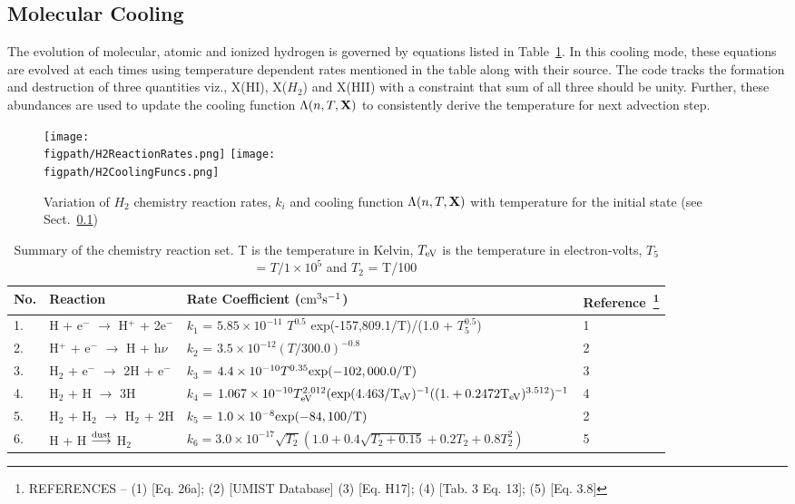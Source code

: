 \documentclass[useAMS,usenatbib,letters]{mn2e}
\newcommand{\figpath}{PFIGS/}
\begin{document}
\subsection{Molecular Cooling}
\label{ssec:molcool}
The evolution of molecular, atomic and ionized hydrogen is governed by
equations listed in Table~\ref{tab:chemeq}. In this cooling mode,
these equations are evolved at each times using temperature dependent
rates mentioned in the table along with their source. The code tracks
the formation and destruction of three quantities viz., X(HI), X($H_{2}$)
and X(HII) with a constraint that sum of all three should be unity.
Further, these abundances are used to update the cooling
function $\Lambda(n,T,{\bf{X}})$ to consistently derive the
temperature for next advection step.


\begin{figure*}
 \texttt{[image: \\figpath/H2ReactionRates.png]}
 \texttt{[image: \\figpath/H2CoolingFuncs.png]}
 \caption{Variation of $H_2$ chemistry reaction rates, $k_{i}$ and cooling
   function $\Lambda(n,T,{\bf{X}})$ with temperature for the initial
   state (see Sect.~\ref{ssec:molcool})}
\label{fig:tempvar}
\end{figure*}

\begin{table*}
\begin{minipage}{\textwidth}
\caption{Summary of the chemistry reaction set. T is the temperature
  in Kelvin, $T_{\rm eV}$ is the temperature in electron-volts, $T_{5}$
  = $T/1\times10^{5}$  and 
$T_{2}$  = T/100}
\label{tab:chemeq}
\begin{tabular}{l l l l}
\hline
No. & Reaction & Rate Coefficient ($\rm {cm}^{3} s^{-1}$) &
Reference~\footnote{REFERENCES -- (1) \cite{Cen:1992p13616} [Eq. 26a];
  (2) \cite{Woodall:2007p13623} [UMIST Database] (3)
  \cite{Galli:1998p13066} [Eq. H17]; (4) \cite{Abel:1997p12836}
  [Tab. 3 Eq. 13]; (5) \cite{Hollenbach:1979p12707} [Eq. 3.8]}\\
\hline
1. & H + e$^{-}$ $\rightarrow$ H$^{+}$ + 2e$^{-}$ & $k_1$ = $5.85
\times 10^{-11}$ $T^{0.5}$ \rm{exp}(-157,809.1/T)/(1.0 + $T_{5}^{0.5}$) & 1\\
2. & H$^{+}$ + e$^{-}$ $\rightarrow$ H + h$\nu$ & $k_2$ =
$3.5\times10^{-12} (T/300.0)^{-0.8}$ & 2\\
3. & H$_{2}$ + e$^{-}$ $\rightarrow$ 2H + e$^{-}$ & $k_3$ =
$4.4\times10^{-10} T^{0.35} \rm{exp}(-102,000.0/T)$ & 3\\
4. & H$_{2}$ + H $\rightarrow$ 3H & $k_4$ = $1.067\times10^{-10}
T_{\rm eV}^{2.012}(\rm{exp}(4.463/T_{\rm eV})^{-1}((1. + 0.2472 T_{\rm eV})^{3.512})^{-1} $& 4\\
5. &H$_{2}$ + H$_{2}$ $\rightarrow$ H$_{2}$ + 2H & $k_5$ = $1.0\times 10^{-8} \rm{exp}(-84,100/T)$ & 2\\
6. & H + H $\overset{\rm dust}\longrightarrow$ H$_{2}$ & $k_6 =
3.0\times10^{-17}\sqrt{T_{2}}(1.0 + 0.4\sqrt{T_{2} + 0.15} + 0.2T_{2} + 0.8T_{2}^{2})$ & 5 \\
\hline
\end{tabular}
\end{minipage}
\end{table*}
\end{document}
